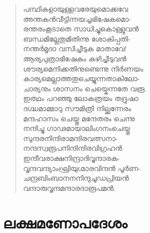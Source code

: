 \begin{verse}
പന്ഥികളായുള്ളവരേയുമൊക്കവേ\\
അന്തകന്‍വീട്ടിന്നയച്ചഭിഷേകമൊ-\\
രന്തരംകൂടാതെ സാധിച്ചുകൊള്ളുവന്‍\\
ബന്ധമില്ലേതുമിതിന്നു ശോകിപ്പതി-\\
നന്തര്‍മൃദാ വസിച്ചീടുക മാതാവേ!\\
ആര്യപുത്രാഭിഷേകം കഴിച്ചീടുവന്‍\\
ശൗര്യമെനിക്കതിനുണ്ടെന്നു നിര്‍ണയം\\
കാര്യമെല്ലാത്തതുചെയ്യുന്നതാകിലോ-\\
ചാര്യനും ശാസനം ചെയ്കെന്നതേ വരൂ.\\
ഇത്ഥം പറഞ്ഞു ലോകത്രയം തദ്രുഷാ\\
ദഗ്ദ്ധമാമ്മാറു സൗമിത്രി നില്ക്കുന്നേരം\\
മന്ദഹാസം ചെയ്തു മന്ദേതരം ചെന്നു\\
നന്ദിച്ചു ഗാഢമായാലിംഗനംചെയ്തു\\
സുന്ദരനിന്ദിരാമന്ദിരവത്സനാ-\\
നന്ദസ്വരൂപനിന്ദിന്ദിരവിഗ്രഹന്‍\\
ഇന്ദീവരാക്ഷനിന്ദ്രാദിവൃന്ദാരക-\\
വൃന്ദവന്ദ്യാംഘ്രിയുഗ്മാരവിന്ദന്‍ പൂര്‍ണ-\\
ചന്ദ്രബിംബാനനനിന്ദുചൂഡപ്രിയന്‍\\
വന്ദാരുവൃന്ദമന്ദാരദാരൂപമന്‍.
\end{verse}


\section{ലക്ഷമണോപദേശം}

